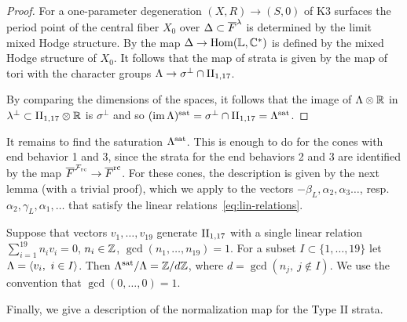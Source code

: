 \documentclass[table,x11names]{amsart}
\begin{document}
\begin{proof}
  For a one-parameter degeneration $(X,R)\to (S,0)$ of K3 surfaces the
  period point of the central fiber  $X_0$ over $\Delta\subset{\overline F}^\lambda$
  is determined by the limit mixed Hodge structure.  By
  \cite[Prop. 3.4]{friedman1986type-III} the map
  $\Delta\to\operatorname{Hom}({\mathbb L},{\mathbb C}^*)$ is defined by the mixed Hodge structure
  of $X_0$. It follows that the map of strata is given by the map of
  tori with the character groups $\Lambda\to\sigma^\perp\cap\IIell$. 

  By comparing the dimensions of the spaces, it follows that the image
  of $\Lambda\otimes{\mathbb R}$ in $\lambda^\perp \subset \IIell\otimes\bR$
  is $\sigma^\perp$ and so $(\im\Lambda)^{\rm sat} =
  \sigma^\perp\cap\IIell = \oLambda$. 
\end{proof}

It remains to find the saturation $\Lambda^{\rm sat}$. This is enough to do for
the cones with end behavior 1 and 3, since the strata for the end
behaviors 2 and 3 are identified by the map ${\overline F}^{{\mathcal F}_{\rm rc}}\to{\overline F}^{{\rm rc}}$. For
these cones, the description is given by the next lemma (with a
trivial proof), which we apply to the vectors
$-\beta_L,\alpha_2, \alpha_3\dotsc$,
resp. $\alpha_2,\gamma_L,\alpha_1,\dotsc$ that satisfy the linear
relations~\eqref{eq:lin-relations}.

\begin{lemma}\label{lem:saturation}
  Suppose that vectors $v_1,\dotsc,v_{19}$ generate $\IIell$ with a
  single linear relation $\sum_{i=1}^{19} n_iv_i = 0$, $n_i\in{\mathbb Z}$,
  $\gcd(n_1,\dotsc,n_{19})=1$. For a subset $I\subset\{1,\dotsc,19\}$
  let $\Lambda = \langle v_i,\ i\in I\rangle$. Then $\Lambda^{\rm sat} / \Lambda =
  {\mathbb Z}/d{\mathbb Z}$, where $d = \gcd(n_j,\ j\not\in I)$. 
We use the convention that $\gcd(0,\dotsc,0) = 1$.
\end{lemma}


Finally, we give a description of the normalization map for the Type
II strata. 
\end{document}
